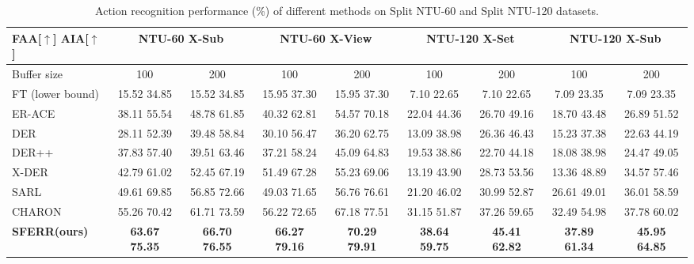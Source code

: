 \documentclass[journal]{IEEEtran}
\begin{document}
\begin{table}[t]
\centering
\caption{Action recognition performance (\%) of different methods on Split NTU-60 and Split NTU-120 datasets.}
\vskip -5pt
\label{tab:results}
\small
\setlength{\tabcolsep}{4pt} %
\renewcommand{\arraystretch}{0.9}
\begin{tabular}{@{}l *{8}{c}@{}}  %
\hline
FAA[$\uparrow$] AIA[$\uparrow$]
& \multicolumn{2}{c}{NTU-60 X-Sub}
& \multicolumn{2}{c}{NTU-60 X-View}
& \multicolumn{2}{c}{NTU-120 X-Set}
& \multicolumn{2}{c}{NTU-120 X-Sub} \\
\hline

Buffer size & 100 & 200 & 100 & 200 & 100 & 200 & 100 & 200 \\
\hline
FT (lower bound)  & 15.52 34.85 & 15.52 34.85 & 15.95 37.30 & 15.95 37.30 & 7.10 22.65 & 7.10 22.65 & 7.09 23.35 & 7.09 23.35\\
ER-ACE\cite{caccia2021}   & 38.11 55.54 & 48.78 61.85 & 40.32 62.81 & 54.57 70.18 & 22.04 44.36 & 26.70 49.16 & 18.70 43.48 & 26.89 51.52\\
DER\cite{buzzega2020}    & 28.11 52.39 & 39.48 58.84 & 30.10 56.47 & 36.20 62.75 & 13.09 38.98 & 26.36 46.43 & 15.23 37.38 & 22.63 44.19\\
DER++\cite{buzzega2020}    & 37.83 57.40 & 39.51 63.46 & 37.21 58.24 & 45.09 64.83 & 19.53 38.86 & 22.70 44.18 & 18.08 38.98 & 24.47 49.05\\
X-DER\cite{boschini2023}   & 42.79 61.02 & 52.45 67.19 & 51.49 67.28 & 55.23 69.06 & 13.19 43.90 & 28.73 53.56 & 13.36 48.89 & 34.57 57.46\\
SARL\cite{sarfraz2025}   & 49.61 69.85 & 56.85 72.66 & 49.03 71.65 & 56.76 76.61 & 21.20 46.02 & 30.99 52.87 & 26.61 49.01 & 36.01 58.59\\
CHARON\cite{mosconi2024}    & 55.26 70.42 & 61.71 73.59 & 56.22 72.65 & 67.18 77.51 & 31.15 51.87 & 37.26 59.65 & 32.49 54.98 & 37.78 60.02\\
\textbf{SFERR(ours)}     & \textbf{63.67 75.35} & \textbf{66.70 76.55} & \textbf{66.27 79.16} & \textbf{70.29 79.91} & \textbf{38.64 59.75} & \textbf{45.41 62.82} & \textbf{37.89 61.34} & \textbf{45.95 64.85}\\
\hline
\end{tabular}
\vspace{-5pt}
\end{table}
\end{document}
